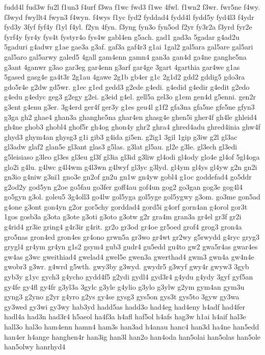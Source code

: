 {fudd4l
fud3w
fu2l
f1un3
f4urf
f3wa
f1wc
fwd3
f1we
4fwl.
f1wn2
f3wr.
fwr5ne
f4wy.
f3wyd
fwyllt4
fwyn3
f4wyn.
f4wys
f1yc
fyd2
fyddad4
fydd4l
fydd5y
fyd4l3
f4ydr
fyd3y
3fyf
fyf4y
f1yl
f4yl.
f2yn
4fyn.
f3yng
fyn3o
fyn5od
f2yr
fy3r2a
f3yrd
fyr2e
fyrf4y
fyr4y
fys4t
fystyr4o
fys4w
gabl4en
g5ach.
gad1
gad3a
5gadar
g4ad2u
5gaduri
g4adwr
g1ae
gae3a
g3af.
gaf3a
gaf4r3
g1ai
1gal2
gal5ara
gal5are
gal5ari
gal5aro
gal5arwy
galed5
4gall
gam4enn
gamn4
gan3a
gan4d
ga4ne
ganghe5na
g3ant
4ganwr
g3ao
gar3eg
gar4enn
g3arf
gar4ge
3gart
4garthia
gar4we
g1as
5gased
gasg4e
ga4t3r
2g1au
4gawe
2g1b
gb4er
g1c
2g1d2
gdd2
gddig5
gdo3ra
gdo5r4e
g2dw
gd5wr.
g1ec
g1ed
gedd3
g2ede
g4edi.
g4edid
g4edir
g4edit
g2edo
g4edu
g4edyc
geg3
g2egy
g2ei.
g3eid
g4el.
gell5a
gel3o
g1em
gen4d
g5enni.
gen2r
g3ent
g4enu
g3er.
3g4erd
ger4f
ger3y
g1es
geu4l
g1f2
gfa3na
gfa5ne
gfe5ne
gfyn3
g3ga
gh2
ghae4
ghan3a
ghanghe5na
ghar4en
ghasg4e
ghen5i
gher4f
gh4le
ghleid4
gh4ne
ghob3
ghobl4
ghof5r
gh4og
ghon4y
ghr2
ghra4
ghred4adu
ghred4inia
ghw4f
ghyd3
ghym4an
ghysg3
g1i
gib3
g4ida
gi5en.
g2ig1
3gil
1gip
g3iw
g2l
gl3ac
gl3adw
glaf2
glan5e
gl3ant
glas3
g5las.
g3lat
gl5au.
gl2e
g3le.
gl3ech
gl3edi
g5leisiaso
g3leo
gl3es
gl3eu
gl3f
gl3ia
gl3id
g3liw
gl4odi
gl4ody
glo4e
gl4of
5gl4oga
glo2i
g4lu.
g4lwc
g4l4wm
g4l3wn
g4lwyf
gl3yc
g3lyd.
gl4ym
gl4ys
gl4yw
g2n
gn2i
gn3io
g4niw
g3n^^ef1
gno3e
gn2of
gn2u
gn1w
gn4yw
gobl4
g1oc
goddefad4
go5ddr
g2od2y
god5yn
g2oe
go5fau
go3fer
goff4au
gof4un
gog2
go3gan
gog3e
gog4l4
go5gyn
g3ol.
goleu5
3g4oll3
go4lw
gol5yga
gol5yge
gol5ygwy
g3om.
go3me
gon5ad
g4one
g3ont
gon4yn
g2or
gor5chy
gorddad4
gord5i
g4orf
gorn4an
g4orol
gor3t
1gos
gosb3a
g3ota
g3ote
g3oti
g3oto
g3otw
g2r
gra4m
gran3a
gr4el
gr3f
gr2i
g4rid4
gr3ie
gring4
g4r3ir
g4rit.
gr2o
gr3od
gr4oe
gr5oed
grof4
grog3
gron4a
gro5nas
gron4ed
gron4es
gr4ono
grwn5a
gr3wo
gr4wt
gr2wy
g5rwydd
g4ryc
gryg3
grygl4
gr4ym
gr4yn
g1s2
gsym4
gub3
gudr4
gu5edd
gu4to
gw2
gwa5r4as
gwar4es
gw4as
g3wc
gweithiad4
gwelad4
gwel5e
gwen3a
gwerthad4
gwm3
gwn4a
gw4n4e
gwobr3
g3wr.
g4wrd
g5wth.
gwy3by
g3wyd.
gwydr5
g3wyf
gwy4r
gwyw3
3gyb
gyb3y
g1yc
gych3
g4ycho
gydd4f5
g2ydi
gydl4
gyd3r4
g4ydu
g4ydy
3gyf
gyf5an
gy4fe
gy4fl
gy4fr
g3yl3a
3gylc
g3yle
g4ylio
g3ylo
g3ylw
g2ym
gym4an
gym3u
gyng3
g2yno
g2yr
g4yro
g2ys
gy4se
gysg3
gys5on
gys3t
gys5to
3gyw
gy3wa
gy3wed
gy3wi
gy3wy
hab3yd
hadd5as
hadd3o
had4eg
had4eny
h4adf
had4fer
hadl4a
had3n
had3r4
h5aeol
ha4f3a
h4afl
haf5ol
h4afs
hag3w
h1ai
h4aif
hal3e
hall3o
hal3o
ham4enn
hamn4
ham3s
han3ad
h4anau
hanc4
han3d
ha4ne
han5edd
han4er
h4ange
hanghen4r
han3ig
han3l
han2o
han4oda
han5olai
han5olas
han5ole
han5olwy
hanrhyd4
}
